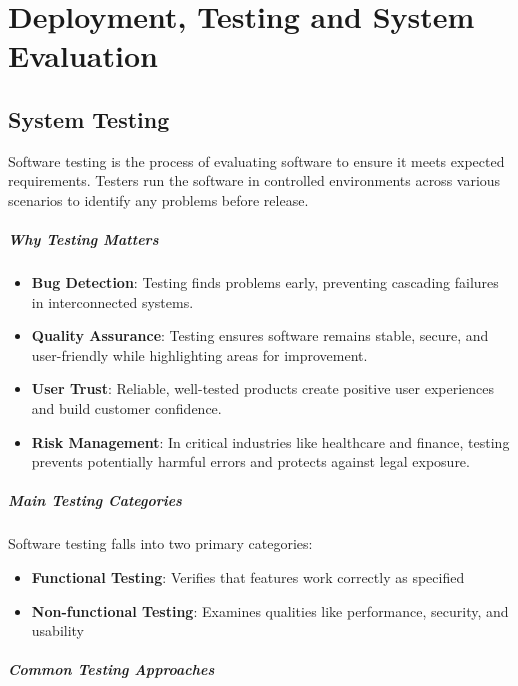 \chapter{Deployment, Testing and System Evaluation}
\section{System Testing}

Software testing \cite{katalon_software_testing} is the process of evaluating software to ensure it meets expected requirements. Testers run the software in controlled environments across various scenarios to identify any problems before release.

\paragraph{Why Testing Matters}

\begin{itemize}
    \item \textbf{Bug Detection}: Testing finds problems early, preventing cascading failures in interconnected systems.
    \item \textbf{Quality Assurance}: Testing ensures software remains stable, secure, and user-friendly while highlighting areas for improvement.
    \item \textbf{User Trust}: Reliable, well-tested products create positive user experiences and build customer confidence.
    \item \textbf{Risk Management}: In critical industries like healthcare and finance, testing prevents potentially harmful errors and protects against legal exposure.
\end{itemize}

\paragraph{Main Testing Categories}

Software testing falls into two primary categories:

\begin{itemize}
    \item \textbf{Functional Testing}: Verifies that features work correctly as specified
    \item \textbf{Non-functional Testing}: Examines qualities like performance, security, and usability
\end{itemize}

\paragraph{Common Testing Approaches}

